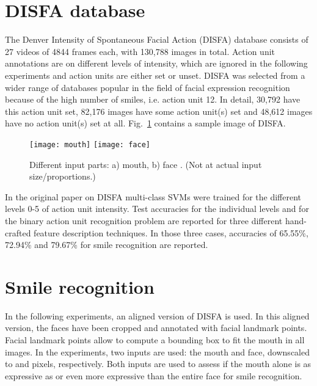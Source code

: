 \documentclass{ws-procs9x6}
\begin{document}
\section{DISFA database}
\label{chapter:stateoftheart}
The Denver Intensity of Spontaneous Facial Action (DISFA) \cite{DISFA} database consists of 27 videos of 4844 frames each, with 130,788 images in total. Action unit annotations are on different levels of intensity, which are ignored in the following experiments and action units are either set or unset. DISFA was selected from a wider range of databases popular in the field of facial expression recognition because of the high number of smiles, i.e. action unit 12. In detail, 30,792 have this action unit set, 82,176 images have some action unit(s) set and 48,612 images have no action unit(s) set at all. Fig.~\ref{fig:mouth_face} contains a sample image of DISFA.

\begin{figure}[h!]
    \centering
    \hfill
    \texttt{[image: mouth]}
    \hfill
    \texttt{[image: face]}
    \hfill~
    \caption{Different input parts: a) mouth, b) face \cite{DISFA}. (Not at actual input size/proportions.)}
    \label{fig:mouth_face}
\end{figure}

In the original paper on DISFA \cite{DISFA} multi-class SVMs were trained for the different levels 0-5 of
action unit intensity. Test accuracies for the individual levels and for the binary action unit recognition
problem are reported for three different hand-crafted feature description techniques. In those three cases,
accuracies of 65.55\%, 72.94\% and 79.67\% for smile recognition are reported.



\section{Smile recognition}
\label{chapter:smile}
In the following experiments, an aligned version of DISFA is used. In this aligned version, the faces have been cropped and annotated with facial landmark points. Facial landmark points allow to compute a bounding box to fit the mouth in all images. In the experiments, two inputs are used: the mouth and face, downscaled to  and  pixels, respectively. Both inputs are used to assess if the mouth alone is as expressive as or even more expressive than the entire face for smile recognition.
\end{document}

